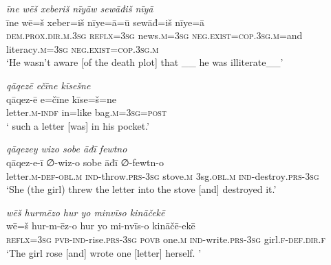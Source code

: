 \ea \label{KŠ.76}
\textit{īne wēš xeberiš nīyāw sewāđiš nīyā} \\ 
\gll īne wē=š xeber=iš nīye=ā=ū sewāđ=iš nīye=ā \\ 
 \textsc{dem.prox}\textsc{.dir}\textsc{.m}\textsc{.3sg} \textsc{reflx}\textsc{=3sg} news\textsc{.m}\textsc{=3sg} \textsc{\textsc{neg.}exist}\textsc{=cop}\textsc{.3sg}\textsc{.m}=and literacy\textsc{.m}\textsc{=3sg} \textsc{\textsc{neg.}exist}\textsc{=cop}\textsc{.3sg}\textsc{.m} \\ 
\glt `He wasn’t aware [of the death plot] that \_\_ he was illiterate\_\_'
\z 
 
\ea \label{KŠ.77}
\textit{qāqezē ečīne kīsešne} \\ 
\gll qāqez-ē e=čīne kīse=š=ne \\ 
 letter\textsc{.m}\textsc{-indf} in=like bag\textsc{.m}\textsc{=3sg}\textsc{=\textsc{post}} \\ 
\glt ` such a letter [was] in his pocket.'
\z 
 
\ea \label{KŠ.78}
\textit{qāqezey wizo sobe āđī fewtno} \\ 
\gll qāqez-e-ī ∅-wiz-o sobe āđī ∅-fewtn-o \\ 
 letter\textsc{.m}\textsc{-def}\textsc{-obl}\textsc{.m} \textsc{ind-}throw\textsc{.prs}\textsc{-3sg} stove\textsc{.m} 3sg\textsc{.obl}\textsc{.m} \textsc{ind-}destroy\textsc{.prs}\textsc{-3sg} \\ 
\glt `She (the girl) threw the letter into the stove [and] destroyed it.'
\z 
 
\ea \label{KŠ.79}
\textit{wēš hurmēzo hur yo minvīso kināčekē} \\ 
\gll wē=š hur-m-ēz-o hur yo mi-nvīs-o kināčē-ekē \\ 
 \textsc{reflx}\textsc{=3sg} \textsc{pvb-}\textsc{ind-}rise\textsc{.prs}\textsc{-3sg} \textsc{povb} one\textsc{.m} \textsc{ind-}write\textsc{.prs}\textsc{-3sg} girl\textsc{.f}\textsc{-def}\textsc{.dir}\textsc{.f} \\ 
\glt `The girl rose [and] wrote one [letter] herself. '
\z 
 
